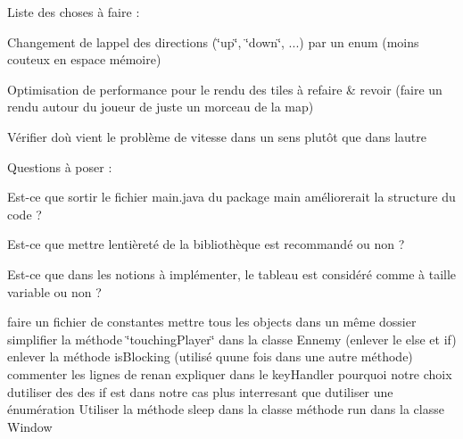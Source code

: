 Liste des choses à faire \+:
\begin{DoxyItemize}
\item Changement de l\textquotesingle{}appel des directions (\char`\"{}up\char`\"{}, \char`\"{}down\char`\"{}, ...) par un enum (moins couteux en espace mémoire)
\item Optimisation de performance pour le rendu des tiles à refaire \& revoir (faire un rendu autour du joueur de juste un morceau de la map)
\item Vérifier d\textquotesingle{}où vient le problème de vitesse dans un sens plutôt que dans l\textquotesingle{}autre
\end{DoxyItemize}

Questions à poser \+:
\begin{DoxyItemize}
\item Est-\/ce que sortir le fichier main.\+java du package main améliorerait la structure du code ?
\item Est-\/ce que mettre l\textquotesingle{}entièreté de la bibliothèque est recommandé ou non ?
\item Est-\/ce que dans les notions à implémenter, le tableau est considéré comme à taille variable ou non ?
\item faire un fichier de constantes mettre tous les objects dans un même dossier simplifier la méthode \char`\"{}touching\+Player\char`\"{} dans la classe Ennemy (enlever le else et if) enlever la méthode is\+Blocking (utilisé qu\textquotesingle{}une fois dans une autre méthode) commenter les lignes de renan expliquer dans le key\+Handler pourquoi notre choix d\textquotesingle{}utiliser des des if est dans notre cas plus interresant que d\textquotesingle{}utiliser une énumération Utiliser la méthode sleep dans la classe méthode run dans la classe Window 
\end{DoxyItemize}
